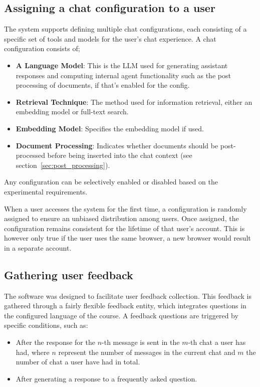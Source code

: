 \subsection{Assigning a chat configuration to a user}


The system supports defining multiple chat configurations, each consisting of a specific set of tools and models for the user’s chat experience. A chat configuration consists of;


\begin{itemize}
        \item \textbf{A Language Model}: This is the \gls{LLM} used for generating assistant responses and computing internal agent functionality such as the post processing of documents, if that’s enabled for the config.
        \item \textbf{Retrieval Technique}: The method used for information retrieval, either an embedding model or full-text search.
        \item \textbf{Embedding Model}: Specifies the embedding model if used.
        \item \textbf{Document Processing}: Indicates whether documents should be post-processed before being inserted into the chat context (see section~\ref{sec:post_processing}).
\end{itemize}


Any configuration can be selectively enabled or disabled based on the experimental requirements.

When a user accesses the system for the first time, a configuration is randomly assigned to ensure an unbiased distribution among users. Once assigned, the configuration remains consistent for the lifetime of that user’s account. This is however only true if the user uses the same browser, a new browser would result in a separate account.


\subsection{Gathering user feedback}
\label{sec:what_you_did_gathering_feedback_data}


The software was designed to facilitate user feedback collection. This feedback is gathered through a fairly flexible feedback entity, which integrates questions in the configured language of the course. A feedback questions are triggered by specific conditions, such as:


\begin{itemize}
\item After the response for the $n$-th message is sent in the $m$-th chat a user has had, where $n$ represent the number of messages in the current chat and $m$ the number of chat a user have had in total.
\item After generating a response to a frequently asked question.
\end{itemize}


